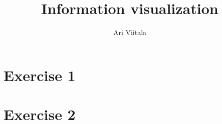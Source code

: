 \documentclass{article}
\title{Information visualization}
\author{Ari Viitala}
\begin{document}
	\maketitle

\section{Exercise 1}

\section{Exercise 2}
\end{document}
